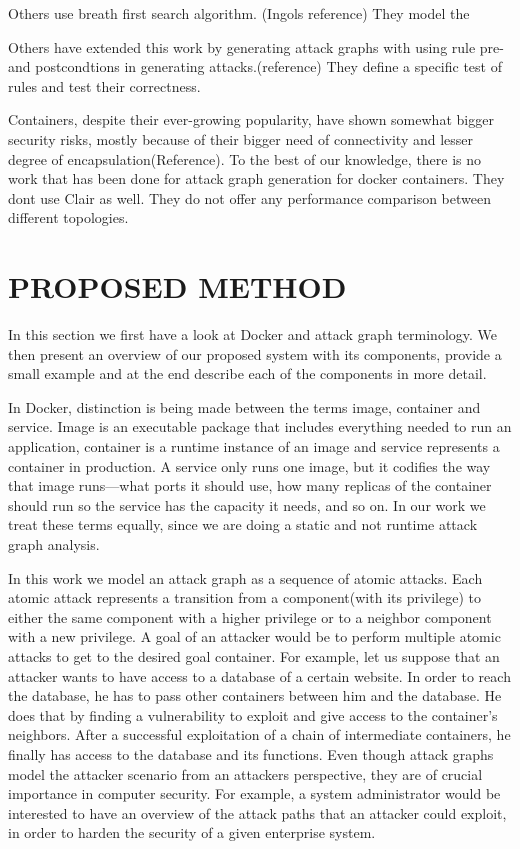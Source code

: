 \documentclass[letterpaper, 10 pt, conference]{ieeeconf}  %
\begin{document}
Others use breath first search algorithm. (Ingols reference)  They model the 

Others have extended this work by generating attack graphs with using rule pre- and postcondtions in generating attacks.(reference) They define a specific test of rules and test their correctness.

Containers, despite their ever-growing popularity, have shown somewhat bigger security risks, mostly because of their bigger need of connectivity and lesser degree of encapsulation(Reference). To the best of our knowledge, there is no work that has been done for attack graph generation for docker containers.
 They dont use Clair as well. They do not offer any performance comparison between different topologies. 

\section{PROPOSED METHOD}


In this section we first have a look at Docker and attack graph terminology. We then present an overview of our proposed system with its components, provide a small example and at the end describe each of the components in more detail. 

In Docker, distinction is being made between the terms image, container and service. Image is an executable package that includes everything needed to run an application,  container is a runtime instance of an image and service represents a container in production. A service only runs one image, but it codifies the way that image runs—what ports it should use, how many replicas of the container should run so the service has the capacity it needs, and so on. In our work we treat these terms equally, since we are doing a static and not runtime attack graph analysis.

In this work we model an attack graph as a sequence of atomic attacks. Each atomic attack represents a transition from a component(with its privilege) to either the same component with a higher privilege or to a neighbor component with a new privilege. A goal of an attacker would be to perform multiple atomic attacks to get to the desired goal container. For example, let us suppose that an attacker wants to have access to a database of a certain website. In order to reach the database, he has to pass other containers between him and the database. He does that by finding a vulnerability to exploit and give access to the container's neighbors. After a successful exploitation of a chain of intermediate containers, he finally has access to the database and its functions. Even though attack graphs model the attacker scenario from an attackers perspective, they are of crucial importance in computer security. For example, a system administrator would be interested to have an overview of the attack paths that an attacker could exploit, in order to harden the security of a given enterprise system.
\end{document}
